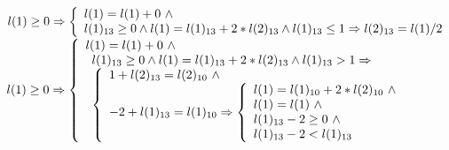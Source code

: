 $
l(1) \ge 0 \Rightarrow
\left\{
\begin{array}{l}
l(1) = l(1) + 0 \  \wedge \\
l(1)_{13} \ge 0 \land
l(1)= l(1)_{13} + 2 * l(2)_{13} 
\land l(1)_{13} \le 1 \Rightarrow l(2)_{13} = l(1)/2
\end{array}
\right.\\
$
$
l(1) \ge 0 \Rightarrow
\left\{
\begin{array}{l}
l(1) = l(1) + 0 \ \wedge \\
\begin{array}{l}
l(1)_{13} \ge 0 \land
l(1) = l(1)_{13} + 2 * l(2)_{13} \land l(1)_{13} > 1 
\Rightarrow \\
\left\{ \begin{array}{l} 1 + l(2)_{13} = l(2)_{10} \ \wedge \\
-2 + l(1)_{13} = l(1)_{10} \Rightarrow \left\{ \begin{array}{l} l(1) = l(1)_{10} + 2 * l(2)_{10} \ \wedge \\ 
l(1) = l(1) \ \wedge \\ l(1)_{13} - 2 \ge 0 \ \wedge \\   l(1)_{13} - 2 <    l(1)_{13}  \end{array} \right.
\end{array} \right.\end{array} \end{array} \right. \\ 
 $

